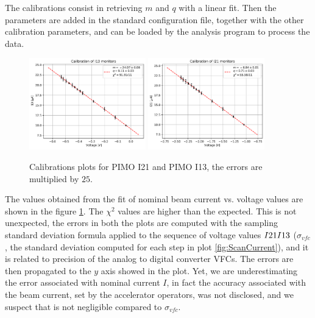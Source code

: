 The calibrations consist in retrieving $m$ and $q$ with a linear fit. Then the parameters are added in the standard configuration file, together with the other calibration parameters, and can be loaded by the analysis program to process the data.  

\begin{figure}[hbtp]
\centering
\includegraphics[width = 0.45\textwidth]{Analysis/Calibrations/I13.pdf}
\includegraphics[width = 0.45\textwidth]{Analysis/Calibrations/I21.pdf} 
\caption{Calibrations plots for PIMO I21 and PIMO I13, the errors are multiplied by $25$.}
\label{fig:PimoCalib}
\end{figure}

The values obtained from the fit of nominal beam current vs. voltage values are shown in the figure \ref{fig:PimoCalib}. The $\chi^{2}$ values are higher than the expected. This is not unexpected, the errors in both the plots are computed with the sampling standard deviation formula applied to the sequence of voltage values $I21\/ I13$ ($\sigma_{vfc}$, the standard deviation computed for each step in plot \ref{fig:ScanCurrent}), and it is related to precision of the analog to digital converter VFCs. The errors are then propagated to the $y$ axis showed in the plot. \smallskip
Yet, we are underestimating the error associated with nominal current $I$, in fact the accuracy associated with the beam current, set by the accelerator operators, was not disclosed, and we suspect that is not negligible compared to $\sigma_{vfc}$. \bigskip  

